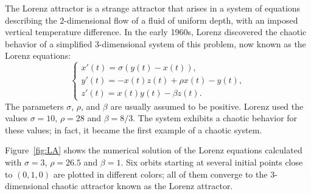 \documentclass{article}
\begin{document}
The Lorenz attractor is a strange attractor that arises in a system of
equations describing the $2$-dimensional flow of a fluid of uniform depth,
with an imposed vertical temperature difference.
In the early 1960s, Lorenz discovered the chaotic behavior of a
simplified $3$-dimensional system of this problem,
now known as the Lorenz equations:
\[
\left\{
\begin{array}{l}
  x'(t) = \sigma (y(t)-x(t)), \\
  y'(t) = -x(t) z(t) + \rho x(t) - y(t), \\
  z'(t) = x(t) y(t) - \beta z(t).
\end{array}
\right.
\]
The parameters $\sigma$, $\rho$, and $\beta$ are usually assumed to be positive. Lorenz used the values $\sigma=10$, $\rho=28$ and $\beta=8/3$. The system exhibits a chaotic behavior for these values; in fact, it became the first example of a chaotic system.

Figure~\ref{fig:LA} shows the numerical solution of the Lorenz equations calculated with
$\sigma = 3$, $\rho = 26.5$ and $\beta = 1$.
Six orbits starting at several initial points close to $(0,1,0)$ are plotted in different colors; all of them converge to the $3$-dimensional chaotic attractor known as the Lorenz attractor.
\end{document}
